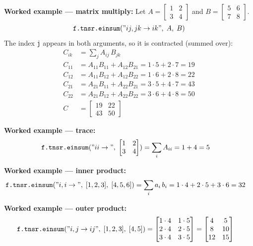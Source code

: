 \textbf{Worked example — matrix multiply:}
Let $A = \begin{bmatrix} 1 & 2 \\ 3 & 4 \end{bmatrix}$ and $B = \begin{bmatrix} 5 & 6 \\ 7 & 8 \end{bmatrix}$.
\begin{align*}
\texttt{f.tnsr.einsum}("ij,jk \rightarrow ik",\; A,\; B)
\end{align*}
The index \texttt{j} appears in both arguments, so it is contracted (summed over):
\begin{align*}
C_{ik} &= \sum_{j} A_{ij} \, B_{jk} \\
C_{11} &= A_{11} B_{11} + A_{12} B_{21} = 1 \cdot 5 + 2 \cdot 7 = 19 \\
C_{12} &= A_{11} B_{12} + A_{12} B_{22} = 1 \cdot 6 + 2 \cdot 8 = 22 \\
C_{21} &= A_{21} B_{11} + A_{22} B_{21} = 3 \cdot 5 + 4 \cdot 7 = 43 \\
C_{22} &= A_{21} B_{12} + A_{22} B_{22} = 3 \cdot 6 + 4 \cdot 8 = 50 \\
C &= \begin{bmatrix} 19 & 22 \\ 43 & 50 \end{bmatrix}
\end{align*}

\textbf{Worked example — trace:}
\begin{align*}
\texttt{f.tnsr.einsum}("ii \rightarrow",\; \begin{bmatrix} 1 & 2 \\ 3 & 4 \end{bmatrix}) &= \sum_{i} A_{ii} = 1 + 4 = 5
\end{align*}

\textbf{Worked example — inner product:}
\begin{align*}
\texttt{f.tnsr.einsum}("i,i \rightarrow",\; [1, 2, 3],\; [4, 5, 6]) &= \sum_{i} a_i \, b_i = 1 \cdot 4 + 2 \cdot 5 + 3 \cdot 6 = 32
\end{align*}

\textbf{Worked example — outer product:}
\begin{align*}
\texttt{f.tnsr.einsum}("i,j \rightarrow ij",\; [1, 2, 3],\; [4, 5]) &= \begin{bmatrix} 1 \cdot 4 & 1 \cdot 5 \\ 2 \cdot 4 & 2 \cdot 5 \\ 3 \cdot 4 & 3 \cdot 5 \end{bmatrix} = \begin{bmatrix} 4 & 5 \\ 8 & 10 \\ 12 & 15 \end{bmatrix}
\end{align*}

